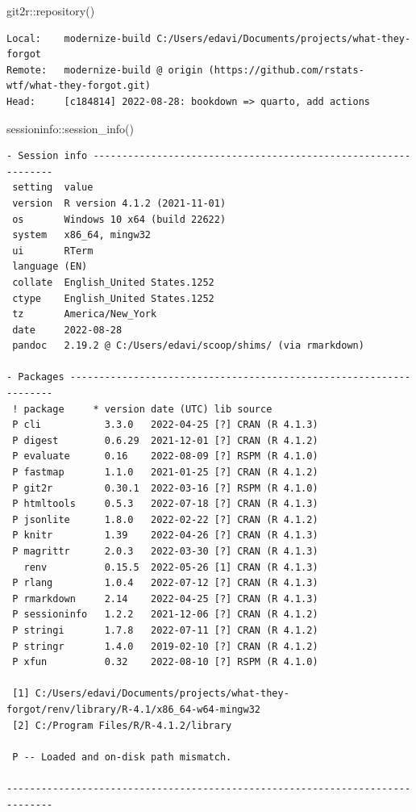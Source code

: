\documentclass[
  letterpaper,
]{book}
\newenvironment{Shaded}{\begin{snugshade}}{\end{snugshade}}
\newcommand{\FunctionTok}[1]{\textcolor[rgb]{0.28,0.35,0.67}{#1}}
\newcommand{\NormalTok}[1]{\textcolor[rgb]{0.00,0.23,0.31}{#1}}
\newcommand{\SpecialCharTok}[1]{\textcolor[rgb]{0.37,0.37,0.37}{#1}}
\begin{document}
\begin{Shaded}
\begin{Highlighting}[]
\NormalTok{git2r}\SpecialCharTok{::}\FunctionTok{repository}\NormalTok{()}
\end{Highlighting}
\end{Shaded}

\begin{verbatim}
Local:    modernize-build C:/Users/edavi/Documents/projects/what-they-forgot
Remote:   modernize-build @ origin (https://github.com/rstats-wtf/what-they-forgot.git)
Head:     [c184814] 2022-08-28: bookdown => quarto, add actions
\end{verbatim}

\begin{Shaded}
\begin{Highlighting}[]
\NormalTok{sessioninfo}\SpecialCharTok{::}\FunctionTok{session\_info}\NormalTok{()}
\end{Highlighting}
\end{Shaded}

\begin{verbatim}
- Session info ---------------------------------------------------------------
 setting  value
 version  R version 4.1.2 (2021-11-01)
 os       Windows 10 x64 (build 22622)
 system   x86_64, mingw32
 ui       RTerm
 language (EN)
 collate  English_United States.1252
 ctype    English_United States.1252
 tz       America/New_York
 date     2022-08-28
 pandoc   2.19.2 @ C:/Users/edavi/scoop/shims/ (via rmarkdown)

- Packages -------------------------------------------------------------------
 ! package     * version date (UTC) lib source
 P cli           3.3.0   2022-04-25 [?] CRAN (R 4.1.3)
 P digest        0.6.29  2021-12-01 [?] CRAN (R 4.1.2)
 P evaluate      0.16    2022-08-09 [?] RSPM (R 4.1.0)
 P fastmap       1.1.0   2021-01-25 [?] CRAN (R 4.1.2)
 P git2r         0.30.1  2022-03-16 [?] RSPM (R 4.1.0)
 P htmltools     0.5.3   2022-07-18 [?] CRAN (R 4.1.3)
 P jsonlite      1.8.0   2022-02-22 [?] CRAN (R 4.1.2)
 P knitr         1.39    2022-04-26 [?] CRAN (R 4.1.3)
 P magrittr      2.0.3   2022-03-30 [?] CRAN (R 4.1.3)
   renv          0.15.5  2022-05-26 [1] CRAN (R 4.1.3)
 P rlang         1.0.4   2022-07-12 [?] CRAN (R 4.1.3)
 P rmarkdown     2.14    2022-04-25 [?] CRAN (R 4.1.3)
 P sessioninfo   1.2.2   2021-12-06 [?] CRAN (R 4.1.2)
 P stringi       1.7.8   2022-07-11 [?] CRAN (R 4.1.2)
 P stringr       1.4.0   2019-02-10 [?] CRAN (R 4.1.2)
 P xfun          0.32    2022-08-10 [?] RSPM (R 4.1.0)

 [1] C:/Users/edavi/Documents/projects/what-they-forgot/renv/library/R-4.1/x86_64-w64-mingw32
 [2] C:/Program Files/R/R-4.1.2/library

 P -- Loaded and on-disk path mismatch.

------------------------------------------------------------------------------
\end{verbatim}


\backmatter
\end{document}

